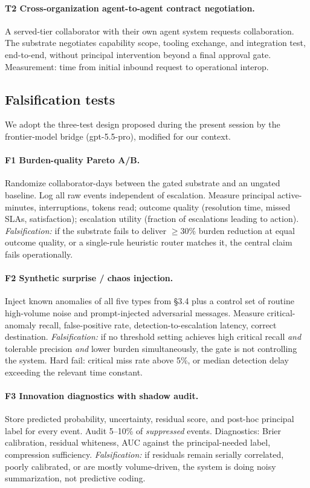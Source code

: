 \documentclass[11pt]{article}
\begin{document}
\paragraph{T2 Cross-organization agent-to-agent contract negotiation.}
A served-tier collaborator with their own agent system requests collaboration. The substrate negotiates capability scope, tooling exchange, and integration test, end-to-end, without principal intervention beyond a final approval gate. Measurement: time from initial inbound request to operational interop.

\subsection{Falsification tests}

We adopt the three-test design proposed during the present session by the frontier-model bridge (gpt-5.5-pro), modified for our context.

\paragraph{F1 Burden-quality Pareto A/B.}
Randomize collaborator-days between the gated substrate and an ungated baseline. Log all raw events independent of escalation. Measure principal active-minutes, interruptions, tokens read; outcome quality (resolution time, missed SLAs, satisfaction); escalation utility (fraction of escalations leading to action). \emph{Falsification:} if the substrate fails to deliver $\geq 30\%$ burden reduction at equal outcome quality, or a single-rule heuristic router matches it, the central claim fails operationally.

\paragraph{F2 Synthetic surprise / chaos injection.}
Inject known anomalies of all five types from §3.4 plus a control set of routine high-volume noise and prompt-injected adversarial messages. Measure critical-anomaly recall, false-positive rate, detection-to-escalation latency, correct destination. \emph{Falsification:} if no threshold setting achieves high critical recall \emph{and} tolerable precision \emph{and} lower burden simultaneously, the gate is not controlling the system. Hard fail: critical miss rate above 5\%, or median detection delay exceeding the relevant time constant.

\paragraph{F3 Innovation diagnostics with shadow audit.}
Store predicted probability, uncertainty, residual score, and post-hoc principal label for every event. Audit 5--10\% of \emph{suppressed} events. Diagnostics: Brier calibration, residual whiteness, AUC against the principal-needed label, compression sufficiency. \emph{Falsification:} if residuals remain serially correlated, poorly calibrated, or are mostly volume-driven, the system is doing noisy summarization, not predictive coding.
\end{document}
